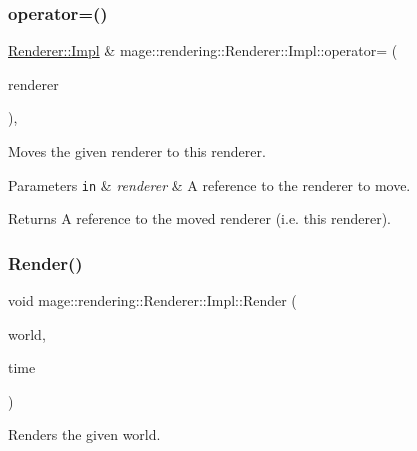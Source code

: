 \subsubsection{\texorpdfstring{operator=()}{operator=()}\hspace{0.1cm}{\footnotesize\ttfamily [2/2]}}
{\footnotesize\ttfamily \hyperlink{classmage_1_1rendering_1_1_renderer_1_1_impl}{Renderer\+::\+Impl} \& mage\+::rendering\+::\+Renderer\+::\+Impl\+::operator= (\begin{DoxyParamCaption}\item[{\hyperlink{classmage_1_1rendering_1_1_renderer_1_1_impl}{Impl} \&\&}]{renderer }\end{DoxyParamCaption})\hspace{0.3cm}{\ttfamily [default]}, {\ttfamily [noexcept]}}

Moves the given renderer to this renderer.


\begin{DoxyParams}[1]{Parameters}
\mbox{\tt in}  & {\em renderer} & A reference to the renderer to move. \\
\hline
\end{DoxyParams}
\begin{DoxyReturn}{Returns}
A reference to the moved renderer (i.\+e. this renderer). 
\end{DoxyReturn}
\hypertarget{classmage_1_1rendering_1_1_renderer_1_1_impl_a88a8601b5fe72883788a87ba6c38b3aa}{}\label{classmage_1_1rendering_1_1_renderer_1_1_impl_a88a8601b5fe72883788a87ba6c38b3aa} 
\subsubsection{\texorpdfstring{Render()}{Render()}\hspace{0.1cm}{\footnotesize\ttfamily [1/2]}}
{\footnotesize\ttfamily void mage\+::rendering\+::\+Renderer\+::\+Impl\+::\+Render (\begin{DoxyParamCaption}\item[{const \hyperlink{classmage_1_1rendering_1_1_world}{World} \&}]{world,  }\item[{const \hyperlink{classmage_1_1_game_time}{Game\+Time} \&}]{time }\end{DoxyParamCaption})}

Renders the given world.


